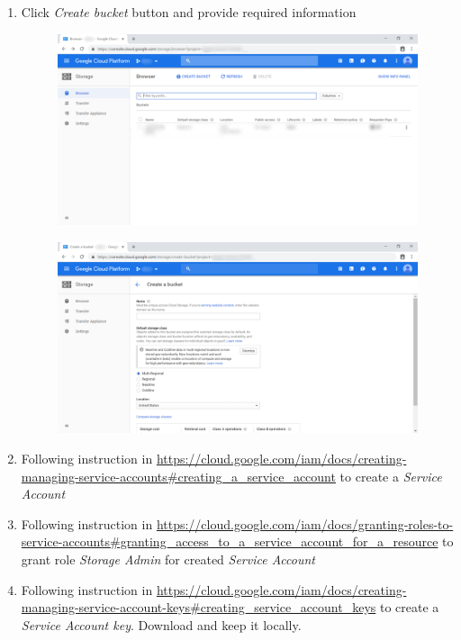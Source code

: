 \begin{enumerate}
\begin{center}
\begin{figure}[H]
	      	\end{figure}
	      \end{center}
	\item Click \textit{Create bucket} button and provide required information
	      \begin{center}
	      	\begin{figure}[H]
	      		\centering
	      		\includegraphics[width=0.6\columnwidth]{images/appendixA/GCP-Storage.PNG}
	      	\end{figure}
	      	\begin{figure}[H]
	      		\centering
	      		\includegraphics[width=0.6\columnwidth]{images/appendixA/GCP-Storage-create-bucket.PNG}
	      	\end{figure}
	      \end{center}
	\item Following instruction in \href{https://cloud.google.com/iam/docs/creating-managing-service-accounts#creating_a_service_account}{https://cloud.google.com/iam/docs/creating-managing-service-accounts\#creating\_a\_service\_account} to create a \textit{Service Account} 
	\item Following instruction in \href{https://cloud.google.com/iam/docs/granting-roles-to-service-accounts#granting_access_to_a_service_account_for_a_resource}{https://cloud.google.com/iam/docs/granting-roles-to-service-accounts\#granting\_access\_to\_a\_service\_account\_for\_a\_resource} to grant role \textit{Storage Admin} for created \textit{Service Account}
	\item Following instruction in \href{https://cloud.google.com/iam/docs/creating-managing-service-account-keys#creating_service_account_keys}{https://cloud.google.com/iam/docs/creating-managing-service-account-keys\#creating\_service\_account\_keys} to create a \textit{Service Account key}. Download and keep it locally.
\end{enumerate}

